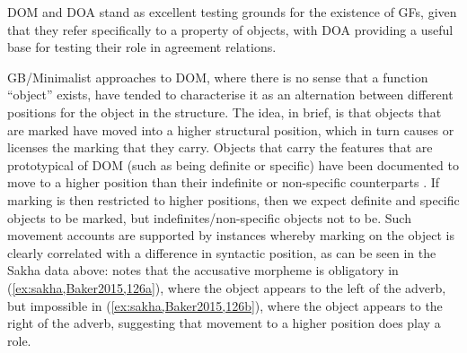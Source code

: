 \documentclass[output=paper
,modfonts
,nonflat]{langsci/langscibook}
\begin{document}
\noindent DOM and DOA stand as excellent testing grounds for the existence of GFs, given that they refer specifically to a property of objects, with DOA providing a useful base for testing their role in agreement relations.

GB/Minimalist approaches to DOM, where there is no sense that a function ``object'' exists, have tended to characterise it as an alternation between different positions for the object in the structure.
The idea, in brief, is that objects that are marked have moved into a higher structural position, which in turn causes or licenses the marking that they carry. Objects that carry the features that are prototypical of DOM (such as being definite or specific) have been documented to move to a higher position than their indefinite or non-specific counterparts \parencite{Diesing1992}. 
If marking is then restricted to higher positions, then we expect definite and specific objects to be marked, but indefinites/non-specific objects not to be.
Such movement accounts are supported by instances whereby marking on the object is clearly correlated with a difference in syntactic position, as can be seen in the Sakha data above: \citeauthor{Baker2015} notes that the accusative morpheme is obligatory in
(\ref{ex:sakha,Baker2015,126a}), where the object appears to the left of the adverb, but impossible in (\ref{ex:sakha,Baker2015,126b}), where the object appears to the right of the adverb, suggesting that movement to a higher position does play a role.
\end{document}
